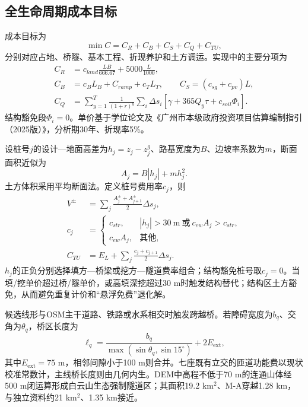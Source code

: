\documentclass[preprint,12pt]{elsarticle}
\begin{document}
\subsection{全生命周期成本目标}

成本目标为
\begin{equation}
\min C=C_R+C_B+C_S+C_Q+C_{TU},
\end{equation}
分别对应占地、桥隧、基本工程、折现养护和土方调运。实现中的主要分项为
\begin{align}
C_R&=c_{land}\frac{LB}{666.67}+5000\frac{L}{1000},\\
C_B&=c_BL_B+C_{ramp}+c_TL_T,\qquad C_S=(c_{sg}+c_{pv})L,\\
C_Q&=\sum_{y=1}^{T}\frac{1}{(1+r)^y}\sum_i\Delta s_i
[\gamma+365Q_y\tau+c_{soil}\Phi_i].
\end{align}
结构豁免段$\Phi_i=0$。单价基于学位论文及《广州市本级政府投资项目估算编制指引（2025版）》\cite{guangzhou2025}，分析期30年、折现率5\%。

设桩号$j$的设计—地面高差为$h_j=z_j-z^g_j$、路基宽度为$B$、边坡率系数为$m$，断面面积近似为
\begin{equation}
A_j=B|h_j|+mh_j^2.
\end{equation}
土方体积采用平均断面法。定义桩号费用率$c_j$，则
\begin{align}
V^{\pm}&=\sum_j\frac{A_j^{\pm}+A_{j+1}^{\pm}}{2}\Delta s_j,\\
c_j&=\begin{cases}
c_{str},&|h_j|>30\ \mathrm{m}\ \text{或}\ c_{ew}A_j>c_{str},\\
c_{ew}A_j,&\text{其他},
\end{cases}\\
C_{TU}&=E_L+\sum_j\frac{c_j+c_{j+1}}{2}\Delta s_j.
\end{align}
$h_j$的正负分别选择填方—桥梁或挖方—隧道费率组合；结构豁免桩号取$c_j=0$。当填/挖单价超过桥/隧单价，或高填深挖超过30 m时触发结构替代；结构区土方豁免，从而避免重复计价和“悬浮免费”退化解。

候选线形与OSM主干道路、铁路或水系相交时触发跨越桥。若障碍宽度为$b_q$、交角为$\theta_q$，桥区长度为
\begin{equation}
\ell_q=\frac{b_q}{\max(\sin\theta_q,\sin15^\circ)}+2E_{\mathrm{ext}},
\end{equation}
其中$E_{\mathrm{ext}}=75$ m，相邻间隙小于100 m则合并。七座既有立交的匝道功能费以现状校准常数计，主线桥长度则由几何内生。DEM中高程不低于70 m的连通山体经500 m闭运算形成白云山生态强制隧道区；其面积19.2 km$^2$、M-A穿越1.28 km，与独立资料约21 km$^2$、1.35 km接近。
\end{document}
